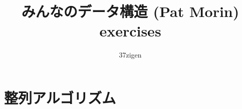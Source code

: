 \documentclass[dvipdfmx]{jarticle}
\title{みんなのデータ構造 (Pat Morin) exercises}
\author{37zigen}
\begin{document}
\maketitle

\section{整列アルゴリズム}


\newpage
\end{document}
